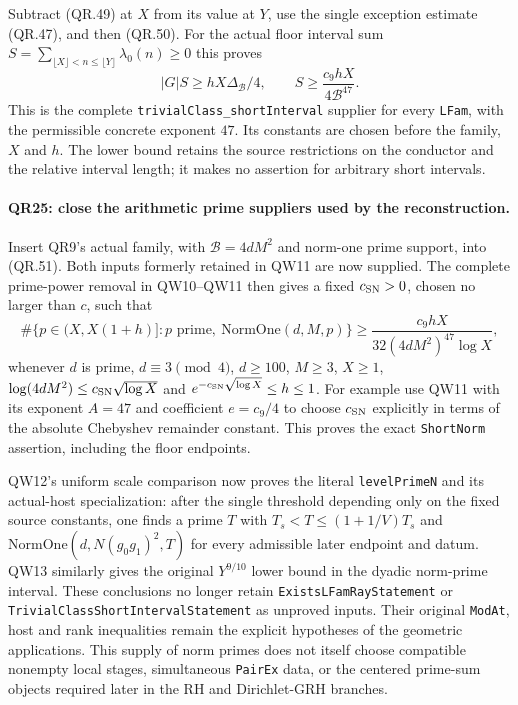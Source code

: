 Subtract (QR.49) at $X$ from its value at $Y$, use the single
exception estimate (QR.47), and then (QR.50). For the actual floor
interval sum $S=\sum_{\lfloor X\rfloor<n\le\lfloor Y\rfloor}
\lambda_0(n)\ge0$ this proves
\[
 |G|S\ge hX\Delta_{\mathcal B}/4,\qquad
 S\ge\frac{c_9hX}{4\mathcal B^{47}}.                     \tag{QR.51}
\]
This is the complete \texttt{trivialClass\_shortInterval} supplier
for every \texttt{LFam}, with the permissible concrete exponent
$47$. Its constants are chosen before the family, $X$ and $h$.
The lower bound retains the source restrictions on the conductor
and the relative interval length; it makes no assertion for arbitrary
short intervals.

\paragraph{QR25: close the arithmetic prime suppliers used by the reconstruction.}
Insert QR9's actual family, with $\mathcal B=4dM^2$ and norm-one
prime support, into (QR.51). Both inputs formerly retained in QW11
are now supplied. The complete prime-power removal in QW10--QW11
then gives a fixed $c_{\rm SN}>0$, chosen no larger than $c$, such
that
\[
 \#\{p\in(X,X(1+h)]:p\text{ prime},\ \mathrm{NormOne}(d,M,p)\}
       \ge\frac{c_9hX}{32(4dM^2)^{47}\log X},             \tag{QR.52}
\]
whenever $d$ is prime, $d\equiv3\pmod4$, $d\ge100$, $M\ge3$,
$X\ge1$, $\log(4dM^2)\le c_{\rm SN}\sqrt{\log X}$ and
$e^{-c_{\rm SN}\sqrt{\log X}}\le h\le1$.
For example use QW11 with its exponent $A=47$ and coefficient
$e=c_9/4$ to choose $c_{\rm SN}$ explicitly in terms of the
absolute Chebyshev remainder constant. This proves the exact
\texttt{ShortNorm} assertion, including the floor endpoints.

QW12's uniform scale comparison now proves the literal
\texttt{levelPrimeN} and its actual-host specialization: after the
single threshold depending only on the fixed source constants, one
finds a prime $T$ with
$T_s<T\le(1+1/V)T_s$ and
$\mathrm{NormOne}(d,N(g_0g_1)^2,T)$ for every admissible later
endpoint and datum. QW13 similarly gives the original
$Y^{9/10}$ lower bound in the dyadic norm-prime interval.
These conclusions no longer retain \texttt{ExistsLFamRayStatement}
or \texttt{TrivialClassShortIntervalStatement} as unproved inputs.
Their original \texttt{ModAt}, host and rank inequalities remain
the explicit hypotheses of the geometric applications. This supply
of norm primes does not itself choose compatible nonempty local
stages, simultaneous \texttt{PairEx} data, or the centered prime-sum
objects required later in the RH and Dirichlet-GRH branches.
